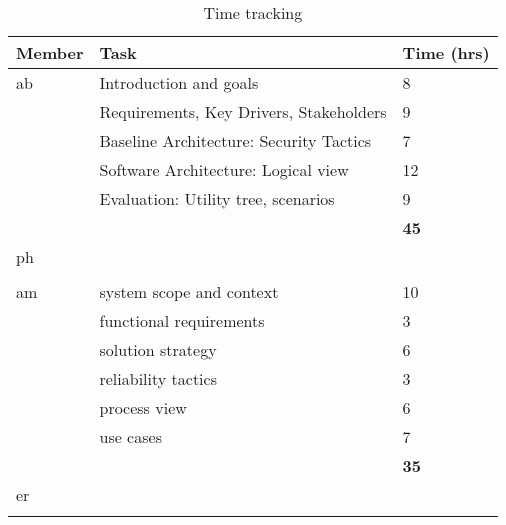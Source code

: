 
\begin{table}[H]
	\centering
	\begin{tabularx}{\textwidth}{p{2cm}|X|p{2.5cm}}
		\textbf{Member} & \textbf{Task} & \textbf{Time (hrs)} \\
		\hline
		ab &Introduction and goals                  & 8 \\
		   &Requirements, Key Drivers, Stakeholders & 9  \\
		   &Baseline Architecture: Security Tactics & 7  \\
		   &Software Architecture: Logical view     &12   \\
		   &Evaluation: Utility tree, scenarios     & 9  \\

		& & \textbf{45} \\
		\hline
		ph &  &  \\
		& & \textbf{} \\
		\hline
		am & system scope and context & 10 \\
		 & functional requirements & 3 \\
		 & solution strategy & 6 \\
		 & reliability tactics & 3 \\
		 & process view & 6 \\
		 & use cases & 7 \\
		& & \textbf{35} \\
		\hline
		er &  &  \\
		& & \textbf{} \\
		\hline
	\end{tabularx}
	\caption{Time tracking}
	\label{tab:timetracking-1}
\end{table}
